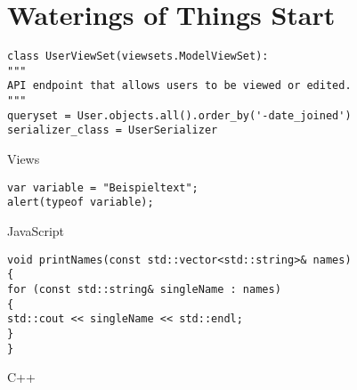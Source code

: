 \section{Waterings of Things Start}

	\renewcommand{\listingscaption}{Code Example}

\begin{listing}[H]
	\begin{verbatim}
class UserViewSet(viewsets.ModelViewSet):
"""
API endpoint that allows users to be viewed or edited.
"""
queryset = User.objects.all().order_by('-date_joined')
serializer_class = UserSerializer
	\end{verbatim}
\caption{Views}
\end{listing}

\begin{listing}[H]
    \begin{verbatim}
var variable = "Beispieltext";
alert(typeof variable);
    \end{verbatim}
    \caption{JavaScript}
\end{listing}

\begin{listing}[H]
    \begin{verbatim}
void printNames(const std::vector<std::string>& names)
{
for (const std::string& singleName : names)
{
std::cout << singleName << std::endl;
}
}
    \end{verbatim}
    \caption{C++}
\end{listing}
